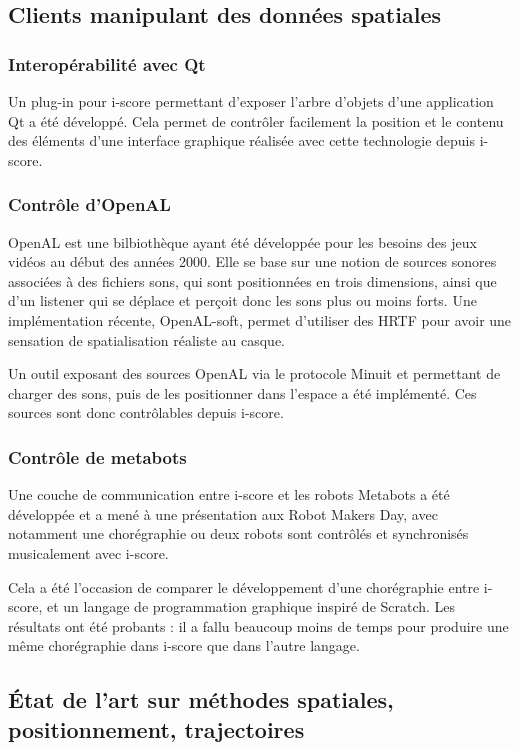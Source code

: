 \documentclass[french]{article}
\begin{document}
\subsection{Clients manipulant des données spatiales}
\subsubsection{Interopérabilité avec Qt}
Un plug-in pour i-score permettant d'exposer l'arbre d'objets d'une application Qt a été développé. Cela permet de contrôler facilement la position et le contenu des éléments d'une interface graphique réalisée avec cette technologie depuis i-score.

\subsubsection{Contrôle d'OpenAL}
OpenAL est une bilbiothèque ayant été développée pour les besoins des jeux vidéos au début des années 2000. Elle se base sur une notion de sources sonores associées à des fichiers sons, qui sont positionnées en trois dimensions, ainsi que d'un listener qui se déplace et perçoit donc les sons plus ou moins forts. Une implémentation récente, OpenAL-soft, permet d'utiliser des HRTF pour avoir une sensation de spatialisation réaliste au casque.  

Un outil exposant des sources OpenAL via le protocole Minuit et permettant de charger des sons, puis de les positionner dans l'espace a été implémenté. Ces sources sont donc contrôlables depuis i-score.

\subsubsection{Contrôle de metabots}
Une couche de communication entre i-score et les robots Metabots
a été développée et a mené à une présentation aux Robot Makers Day, avec notamment 
une chorégraphie ou deux robots sont contrôlés et synchronisés musicalement avec i-score. 

Cela a été l'occasion de comparer le développement d'une chorégraphie entre i-score, et 
un langage de programmation graphique inspiré de Scratch. Les résultats ont été probants : il a fallu 
beaucoup moins de temps pour produire une même chorégraphie dans i-score que dans l'autre langage.


\subsection{État de l'art sur méthodes spatiales, positionnement, trajectoires}
\end{document}
